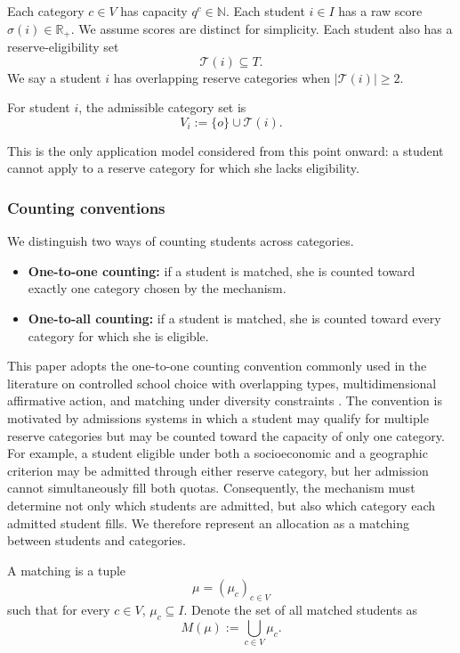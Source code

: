 \documentclass[runningheads]{llncs}
\newcommand{\T}{\mathcal{T}}
\newcommand{\R}{\mathbb{R}}
\newcommand{\1}{\mathbf{1}}
\begin{document}
Each category $c\in V$ has capacity $q^c\in\mathbb{N}$. Each student $i\in I$ has a raw score $\sigma(i)\in\R_+$. We assume scores are distinct for simplicity. Each student also has a reserve-eligibility set
\[
\T(i)\subseteq T.
\]
We say a student $i$ has overlapping reserve categories when $|\T(i)|\geq 2$.

\begin{definition}
For student $i$, the admissible category set is
\[
V_i:=\{o\}\cup\T(i).
\]
\end{definition}

This is the only application model considered from this point onward: a student cannot apply to a reserve category for which she lacks eligibility.

\subsubsection{Counting conventions}

We distinguish two ways of counting students across categories.

\begin{itemize}
\item \textbf{One-to-one counting:} if a student is matched, she is counted toward exactly one category chosen by the mechanism.
\item \textbf{One-to-all counting:} if a student is matched, she is counted toward every category for which she is eligible.
\end{itemize}

This paper adopts the one-to-one counting convention commonly used in the literature on controlled school choice with overlapping types, multidimensional affirmative action, and matching under diversity constraints \cite{KHIY17a,AyBo21a,GKK+17a}. The convention is motivated by admissions systems in which a student may qualify for multiple reserve categories but may be counted toward the capacity of only one category. For example, a student eligible under both a socioeconomic and a geographic criterion may be admitted through either reserve category, but her admission cannot simultaneously fill both quotas. Consequently, the mechanism must determine not only which students are admitted, but also which category each admitted student fills. We therefore represent an allocation as a matching between students and categories.

\begin{definition}[Matching]
A matching is a tuple
\[
\mu=(\mu_c)_{c\in V}
\]
such that for every $c\in V$, $\mu_c\subseteq I$.
Denote the set of all matched students as
\[
M(\mu):=\bigcup_{c\in V}\mu_c.
\]
\end{definition}
\end{document}
